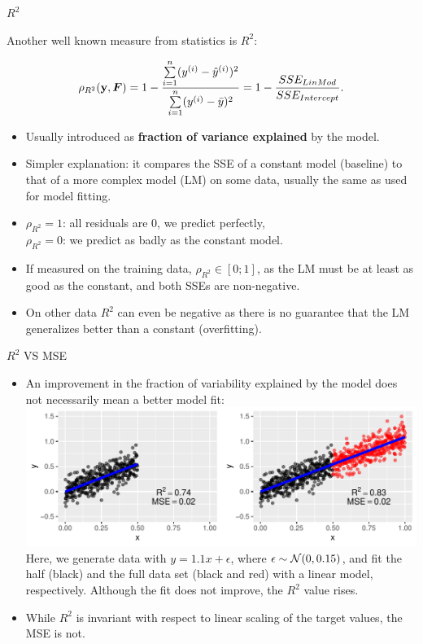 \begin{vbframe}{$R^2$}
\begin{small}
Another well known measure from statistics is $R^2$:

\[
\rho_{R^2}(\mathbf{y}, \boldsymbol{F}) = 1 - \frac{\sum\limits_{i=1}^n (y^{(i)} - \hat{y}^{(i)})^2}{\sum\limits_{i=1}^n (y^{(i)} - \bar{y})^2} = 1 - \frac{SSE_{LinMod}}{SSE_{Intercept}}.
\]

\begin{itemize}
  \item Usually introduced as \textbf{fraction of variance explained} by the 
  model.
  \item Simpler explanation: it compares the SSE of a constant model (baseline) 
  to that of a more complex model (LM) on some data, usually the same as used 
  for model fitting.
  \item $\rho_{R^2}=1$: all residuals are 0, we predict perfectly, \\
  $\rho_{R^2}=0$: we predict as badly as the constant model.
  \item If measured on the training data, $\rho_{R^2} \in [0;1]$, as the LM must be at 
  least as good as the constant, and both SSEs are non-negative.
  \item On other data $R^2$ can even be negative as there is no guarantee that 
  the LM generalizes better than a constant (overfitting).
\end{itemize}
\end{small}
\end{vbframe}


\begin{vbframe}{$R^2$ VS MSE}
\begin{small}
\begin{itemize}
\item An improvement in the fraction of variability explained by the model does not 
necessarily mean a better model fit:
\includegraphics[width=\textwidth]{figure/eval_mse_r2}
Here, we generate data with $y = 1.1x + \epsilon$, where $\epsilon \sim \mathcal{N}(0, 0.15)$, and fit the half (black) and the full data set (black and red) with a linear model, respectively. Although the fit does not improve, the $R^2$ value rises.
\item While $R^2$ is invariant with respect to linear scaling of the target values, the MSE is not.
\end{itemize}
\end{small}
\end{vbframe}

